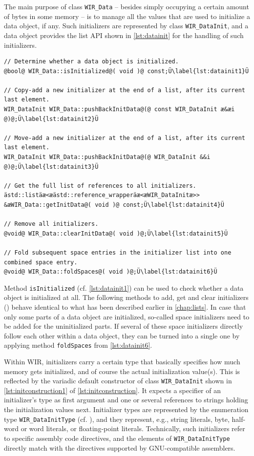 The main purpose of class \texttt{WIR\_Data} -- besides simply occupying a certain amount of bytes in some memory -- is to manage all the values that are used to initialize a data object, if any.
Such initializers are represented by class \texttt{WIR\_DataInit}, and a data object provides the list \gls{API} shown in \cref{lst:datainit} for the handling of such initializers.

\begin{lstlisting}[style=code,float=h,caption={Initializer Handling of Class \texttt{WIR\_Data}},label=lst:datainit]
// Determine whether a data object is initialized.
@bool@ WIR_Data::isInitialized@( void )@ const;Ü\label{lst:datainit1}Ü

// Copy-add a new initializer at the end of a list, after its current last element.
WIR_DataInit WIR_Data::pushBackInitData@(@ const WIR_DataInit æ&æi @)@;Ü\label{lst:datainit2}Ü

// Move-add a new initializer at the end of a list, after its current last element.
WIR_DataInit WIR_Data::pushBackInitData@(@ WIR_DataInit &&i @)@;Ü\label{lst:datainit3}Ü

// Get the full list of references to all initializers.
ästd::listäæ<æästd::reference_wrapperäæ<æWIR_DataInitæ>> &æWIR_Data::getInitData@( void )@ const;Ü\label{lst:datainit4}Ü

// Remove all initializers.
@void@ WIR_Data::clearInitData@( void )@;Ü\label{lst:datainit5}Ü

// Fold subsequent space entries in the initializer list into one combined space entry.
@void@ WIR_Data::foldSpaces@( void )@;Ü\label{lst:datainit6}Ü
\end{lstlisting}

Method \texttt{isInitialized} (cf. \cref{lst:datainit1}) can be used to check whether a data object is initialized at all.
The following methods to add, get and clear initializers () behave identical to what has been described earlier in \cref{chap:lists}.
In case that only some parts of a data object are initialized, so-called space initializers need to be added for the uninitialized parts.
If several of these space initializers directly follow each other within a data object, they can be turned into a single one by applying method \texttt{foldSpaces} from \cref{lst:datainit6}.

Within \gls{WIR}, initializers carry a certain type that basically specifies how much memory gets initialized, and of course the actual initialization value(s).
This is reflected by the variadic default constructor of class \texttt{WIR\_DataInit} shown in \cref{lst:initconstruction1} of \cref{lst:initconstruction}.
It expects a specifier of an initializer's type as first argument and one or several references to strings holding the initialization values next.
Initializer types are represented by the enumeration type \texttt{WIR\_DataInitType} (cf. ), and they represent, e.g., string literals, byte, half-word or word literals, or floating-point literals.
Technically, such initializers refer to specific assembly code directives, and the elements of \texttt{WIR\_DataInitType} directly match with the directives supported by GNU-compatible assemblers.

